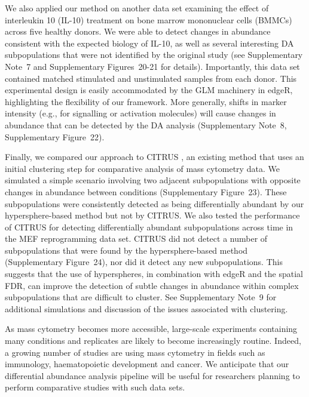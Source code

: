 \documentclass{article}
\newcommand{\suppsecbmmc}{7}
\newcommand{\suppsecsignal}{8}
\newcommand{\suppsecclust}{9}
\newcommand{\suppfigbmmc}{20}
\newcommand{\suppfigbmmcmark}{21}
\newcommand{\suppfigshiftsim}{22}
\newcommand{\suppfigclustersim}{23}
\newcommand{\suppfigclusterreal}{24}
\begin{document}
We also applied our method on another data set \cite{levine2015datadriven} examining the effect of interleukin 10 (IL-10) treatment on bone marrow mononuclear cells (BMMCs) across five healthy donors.
We were able to detect changes in abundance consistent with the expected biology of IL-10, as well as several interesting DA subpopulations that were not identified by the original study (see Supplementary Note~\suppsecbmmc{} and Supplementary Figures~\suppfigbmmc{}-\suppfigbmmcmark{} for details).
Importantly, this data set contained matched stimulated and unstimulated samples from each donor.
This experimental design is easily accommodated by the GLM machinery in edgeR, highlighting the flexibility of our framework.
More generally, shifts in marker intensity (e.g., for signalling or activation molecules) will cause changes in abundance that can be detected by the DA analysis (Supplementary Note~\suppsecsignal{}, Supplementary Figure~\suppfigshiftsim{}).

Finally, we compared our approach to CITRUS \cite{bruggner2014automated}, an existing method that uses an initial clustering step for comparative analysis of mass cytometry data.
We simulated a simple scenario involving two adjacent subpopulations with opposite changes in abundance between conditions (Supplementary Figure~\suppfigclustersim{}).
These subpopulations were consistently detected as being differentially abundant by our hypersphere-based method but not by CITRUS.
We also tested the performance of CITRUS for detecting differentially abundant subpopulations across time in the MEF reprogramming data set.
CITRUS did not detect a number of subpopulations that were found by the hypersphere-based method (Supplementary Figure~\suppfigclusterreal{}), nor did it detect any new subpopulations.
This suggests that the use of hyperspheres, in combination with edgeR and the spatial FDR, can improve the detection of subtle changes in abundance within complex subpopulations that are difficult to cluster.
See Supplementary Note~\suppsecclust{} for additional simulations and discussion of the issues associated with clustering.

As mass cytometry becomes more accessible, large-scale experiments containing many conditions and replicates are likely to become increasingly routine.
Indeed, a growing number of studies are using mass cytometry in fields such as immunology, haematopoietic development and cancer.
We anticipate that our differential abundance analysis pipeline will be useful for researchers planning to perform comparative studies with such data sets.
\end{document}
